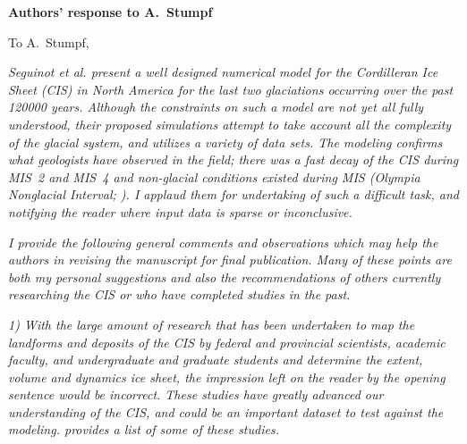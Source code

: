 \documentclass[10pt]{article}
\begin{document}
\textbf{Authors' response to A.~Stumpf}
\bigskip


\newcommand{\doi}[1]{doi:\allowbreak\href{http://dx.doi.org/#1}{#1}}
\newcommand{\sechead}[1]{\bigskip\noindent\textbf{#1}}
\newcommand{\referee}[1]{\bigskip\textcolor{journalname}{\textit{#1}}}
\newcommand{\msquote}[1]{\begin{quote}\textit{#1}\end{quote}}
\newcommand{\todo}[1]{\textcolor{adgeored}{TODO: #1}}

To A.~Stumpf,

\referee{%
    Seguinot et al. present a well designed numerical model for the Cordilleran
    Ice Sheet (CIS) in North America for the last two glaciations occurring
    over the past 120000 years. Although the constraints on such a model are
    not yet all fully understood, their proposed simulations attempt to take
    account all the complexity of the glacial system, and utilizes a variety of
    data sets. The modeling confirms what geologists have observed in the
    field; there was a fast decay of the CIS during MIS~2 and MIS~4 and
    non-glacial conditions existed during MIS (Olympia Nonglacial Interval;
    \citealp[e.g.,][]{Plouffe.Jette.1997}). I applaud them for undertaking of
    such a difficult task, and notifying the reader where input data is sparse
    or inconclusive.}

\referee{%
    I provide the following general comments and observations which may help
    the authors in revising the manuscript for final publication. Many of these
    points are both my personal suggestions and also the recommendations of
    others currently researching the CIS or who have completed studies in the
    past.}

\referee{%
    1) With the large amount of research that has been undertaken to map the
    landforms and deposits of the CIS by federal and provincial scientists,
    academic faculty, and undergraduate and graduate students and determine the
    extent, volume and dynamics ice sheet, the impression left on the reader by
    the opening sentence would be incorrect. These studies have greatly
    advanced our understanding of the CIS, and could be an important dataset to
    test against the modeling. \citet{Stumpf.etal.2014} provides a list of some
    of these studies.}
\end{document}
